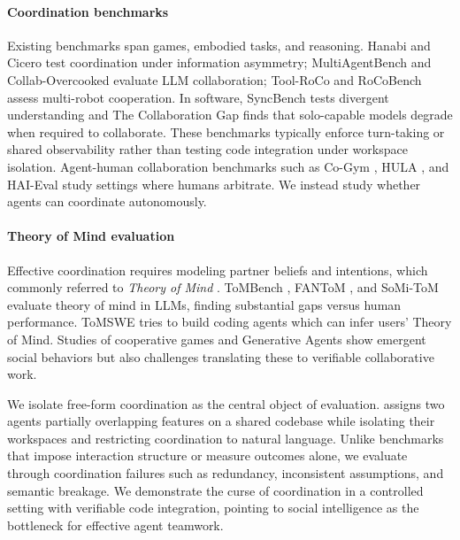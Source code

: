 \paragraph{Coordination benchmarks}
Existing benchmarks span games, embodied tasks, and reasoning. Hanabi \citep{forkel2025entropyneedinterseedcrossplay} and Cicero \citep{meta2022cicero} test coordination under information asymmetry; MultiAgentBench \citep{sun2025multiagentbench} and Collab-Overcooked \citep{zhang2025collabovercooked} evaluate LLM collaboration; Tool-RoCo \citep{guo2025toolroco} and RoCoBench \citep{mandi2024roco} assess multi-robot cooperation. In software, SyncBench \citep{liu2025syncmind} tests divergent understanding and The Collaboration Gap \citep{davidson2025collaborationgap} finds that solo-capable models degrade when required to collaborate. These benchmarks typically enforce turn-taking or shared observability rather than testing code integration under workspace isolation. Agent-human collaboration benchmarks such as Co-Gym \citep{shao2024cogym}, HULA \citep{takerngsaksiri2025humanintheloopsoftwaredevelopmentagents}, and HAI-Eval \citep{luo2025haievalmeasuringhumanaisynergy} study settings where humans arbitrate. We instead study whether agents can coordinate autonomously.

\paragraph{Theory of Mind evaluation}
Effective coordination requires modeling partner beliefs and intentions, which commonly referred to \emph{Theory of Mind} \citep{premack_does_1978, rabinowitz2018machine, zhu2021few}. ToMBench \citep{chen2024tombench}, FANToM \citep{kim2023fantom}, and SoMi-ToM \citep{fan2025somitom} evaluate theory of mind in LLMs, finding substantial gaps versus human performance. ToMSWE \citep{zhou2025tom} tries to build coding agents which can infer users' Theory of Mind. Studies of cooperative games \citep{li2023theoryofmind} and Generative Agents \citep{park2023generative} show emergent social behaviors but also challenges translating these to verifiable collaborative work.


We isolate free-form coordination as the central object of evaluation. \dataset assigns two agents partially overlapping features on a shared codebase while isolating their workspaces and restricting coordination to natural language. Unlike benchmarks that impose interaction structure or measure outcomes alone, we evaluate through coordination failures such as redundancy, inconsistent assumptions, and semantic breakage. We demonstrate the curse of coordination in a controlled setting with verifiable code integration, pointing to social intelligence as the bottleneck for effective agent teamwork.

